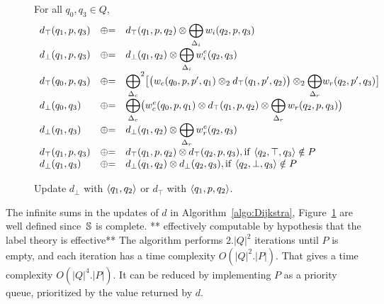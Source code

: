 \begin{figure}
For all $q_0, q_3 \in Q$, %
\[
\begin{array}{lcl}
d_\top(q_1, p, q_3) & \opluseq &
  d_\top(q_1, p, q_2) \otimes
  \displaystyle\bigoplus_{\Deltai} \weii(q_2, p, q_3)\\
%
d_\bot(q_1, p, q_3) & \opluseq &
  d_\bot(q_1, q_2) \otimes
  \displaystyle\bigoplus_{\Deltai} \weiei(q_2, q_3)\\
%
d_\top(q_0, p, q_3) & \opluseq &
  {\displaystyle\bigoplus_{\Deltac}}^2
  \bigl[ \bigl( \weic(q_0, p, p', q_1) \otimes_2
  d_\top(q_1, p', q_2) \bigr) \otimes_2
  {\displaystyle\bigoplus_{\Deltar}} \weir(q_2, p', q_3) \bigr]\\
%
d_\bot(q_0, q_3) & \opluseq &
  {\displaystyle\bigoplus_{\Deltac}}
  \bigl(
  \weiec(q_0, p, q_1) \otimes
   d_\top(q_1, p, q_2) \otimes
  \displaystyle\bigoplus_{\Deltar} \weir(q_2, p, q_3)\bigr)\\
%
d_\bot(q_1, q_3) & \opluseq &
  d_\bot(q_1, q_2) \otimes
  \displaystyle\bigoplus_{\Deltar} \weier(q_2, q_3)\\
%
d_\top(q_1, p, q_3) & \opluseq &
  d_\top(q_1, p, q_2) \otimes d_\top(q_2, p, q_3),
  \mathrm{if~} \< q_2, \top, q_3> \notin P \\
%
d_\bot(q_1, q_3) & \opluseq &
  d_\bot(q_1, q_2) \otimes d_\bot(q_2, q_3), \mathrm{if~} \< q_2, \bot, q_3> \notin P \\
\end{array}
\]
%
\caption{Update $d_\bot$ with $\<q_1, q_2>$ or $d_\top$ with $\< q_1, p, q_2>$.}
\label{fig:best-update}
\end{figure}


\noindent
{}
The infinite sums in the updates of $d$ in Algorithm~\ref{algo:Dijkstra},
Figure~\ref{fig:best-update}
are well defined
since~$\mathbb{S}$ is complete.
** effectively computable by hypothesis that the label theory is effective**
The algorithm performs $2.|Q|^2$ iterations until $P$ is empty,
and each iteration has a time complexity $O(|Q|^2 . |P|)$.
That gives a time complexity $O(|Q|^4 . |P|)$.
It can be reduced by implementing $P$ as a priority queue,
prioritized by the value returned by $d$.

